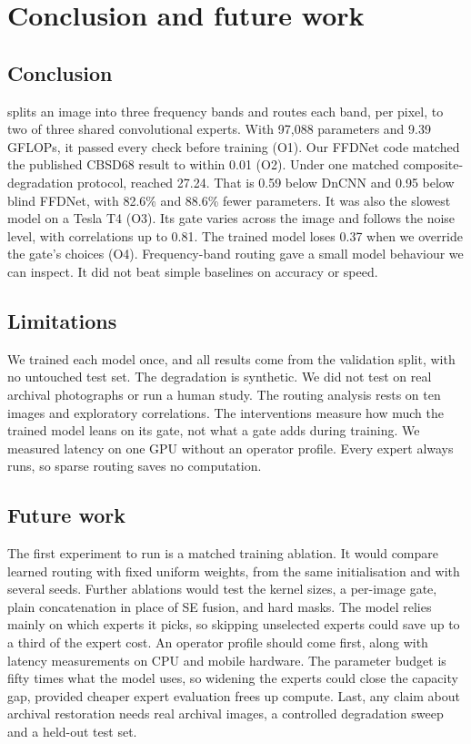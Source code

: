 \chapter{Conclusion and future work}\label{ch:conclusion}

\section{Conclusion}\label{sec:summary}

\fcsg{} splits an image into three frequency bands and routes each band, per
pixel, to two of three shared convolutional experts. With 97,088 parameters
and 9.39 GFLOPs, it passed every check before training (O1). Our FFDNet code
matched the published CBSD68 result to within 0.01\dB{} (O2). Under one
matched composite-degradation protocol, \fcsg{} reached 27.24\dB{}. That is
0.59\dB{} below DnCNN and 0.95\dB{} below blind FFDNet, with 82.6\% and
88.6\% fewer parameters. It was also the slowest model on a Tesla T4 (O3).
Its gate varies across the image and follows the noise level, with
correlations up to 0.81. The trained model loses 0.37\dB{} when we override
the gate's choices (O4). Frequency-band routing gave a small model behaviour
we can inspect. It did not beat simple baselines on accuracy or speed.

\section{Limitations}\label{sec:limitations}

We trained each model once, and all results come from the validation split,
with no untouched test set. The degradation is synthetic. We did not test on
real archival photographs or run a human study. The routing analysis rests on
ten images and exploratory correlations. The interventions measure how much
the trained model leans on its gate, not what a gate adds during training. We
measured latency on one GPU without an operator profile. Every expert always
runs, so sparse routing saves no computation.

\section{Future work}\label{sec:future}

The first experiment to run is a matched training ablation. It would compare
learned routing with fixed uniform weights, from the same initialisation and
with several seeds. Further ablations would test the kernel sizes, a
per-image gate, plain concatenation in place of SE fusion, and hard masks.
The model relies mainly on which experts it picks, so skipping unselected
experts could save up to a third of the expert cost. An operator profile
should come first, along with latency measurements on CPU and mobile
hardware. The parameter budget is fifty times what the model uses, so
widening the experts could close the capacity gap, provided cheaper expert
evaluation frees up compute. Last, any claim about archival restoration needs
real archival images, a controlled degradation sweep and a held-out test set.
